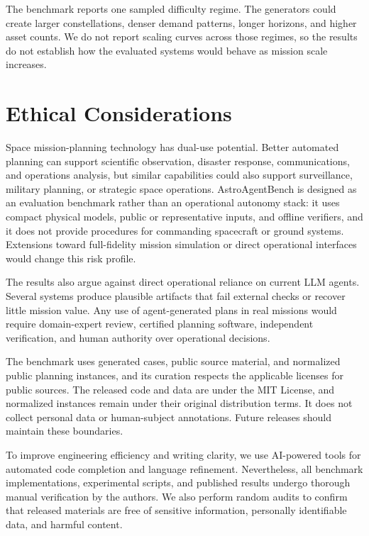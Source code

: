 \documentclass[]{mosi}
\begin{document}
The benchmark reports one sampled difficulty regime. The generators could create larger constellations, denser demand patterns, longer horizons, and higher asset counts. We do not report scaling curves across those regimes, so the results do not establish how the evaluated systems would behave as mission scale increases.

\section*{Ethical Considerations}

Space mission-planning technology has dual-use potential. Better automated planning can support scientific observation, disaster response, communications, and operations analysis, but similar capabilities could also support surveillance, military planning, or strategic space operations. AstroAgentBench is designed as an evaluation benchmark rather than an operational autonomy stack: it uses compact physical models, public or representative inputs, and offline verifiers, and it does not provide procedures for commanding spacecraft or ground systems. Extensions toward full-fidelity mission simulation or direct operational interfaces would change this risk profile.

The results also argue against direct operational reliance on current LLM agents. Several systems produce plausible artifacts that fail external checks or recover little mission value. Any use of agent-generated plans in real missions would require domain-expert review, certified planning software, independent verification, and human authority over operational decisions.

The benchmark uses generated cases, public source material, and normalized public planning instances, and its curation respects the applicable licenses for public sources. The released code and data are under the MIT License, and normalized instances remain under their original distribution terms. It does not collect personal data or human-subject annotations. Future releases should maintain these boundaries.

To improve engineering efficiency and writing clarity, we use AI-powered tools for automated code completion and language refinement. Nevertheless, all benchmark implementations, experimental scripts, and published results undergo thorough manual verification by the authors. We also perform random audits to confirm that released materials are free of sensitive information, personally identifiable data, and harmful content.
\end{document}
